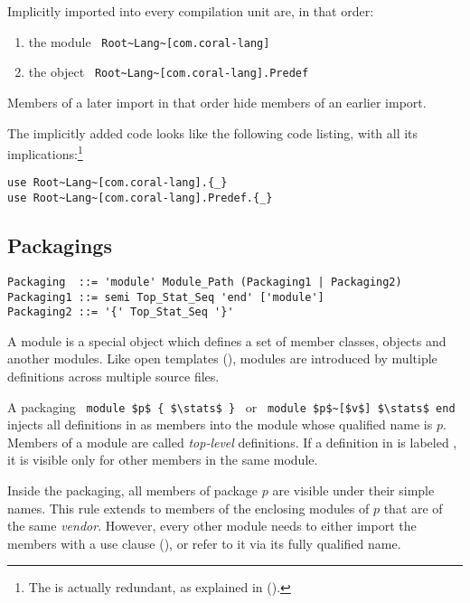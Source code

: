 Implicitly imported into every compilation unit are, in that order: 
\begin{enumerate}
\item the module ~\lstinline!Root~Lang~[com.coral-lang]! 
\item the object ~\lstinline!Root~Lang~[com.coral-lang].Predef!
\end{enumerate} 
Members of a later import in that order hide members of an earlier import. 


The implicitly added code looks like the following code listing, with all its implications:\footnote{The  is actually redundant, as explained in ().}
\begin{lstlisting}
use Root~Lang~[com.coral-lang].{_}
use Root~Lang~[com.coral-lang].Predef.{_}
\end{lstlisting}





\subsection{Packagings}

\syntax\begin{lstlisting}
Packaging  ::= 'module' Module_Path (Packaging1 | Packaging2)
Packaging1 ::= semi Top_Stat_Seq 'end' ['module']
Packaging2 ::= '{' Top_Stat_Seq '}'
\end{lstlisting}

A module is a special object which defines a set of member classes, objects and another modules. Like open templates (), modules are introduced by multiple definitions across multiple source files.  

A packaging ~\lstinline!module $p$ { $\stats$ }!~ or ~\lstinline!module $p$~[$v$] $\stats$ end!~ injects all definitions in \stats as members into the module whose qualified name is $p$. Members of a module are called {\em top-level} definitions. If a definition in \stats is labeled , it is visible only for other members in the same module. 

Inside the packaging, all members of package $p$ are visible under their simple names. This rule extends to members of the enclosing modules of $p$ that are of the same {\em vendor}. However, every other module needs to either import the members with a use clause (), or refer to it via its fully qualified name. 

